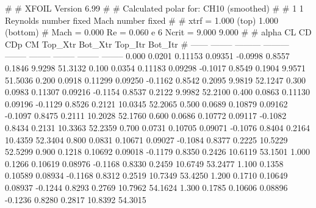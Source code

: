 #  
#       XFOIL         Version 6.99
#  
# Calculated polar for: CH10 (smoothed)                                 
#  
# 1 1 Reynolds number fixed          Mach number fixed         
#  
# xtrf =   1.000 (top)        1.000 (bottom)  
# Mach =   0.000     Re =     0.060 e 6     Ncrit =   9.000  9.000
#  
#   alpha    CL        CD       CDp       CM     Top_Xtr  Bot_Xtr  Top_Itr  Bot_Itr
#  ------ -------- --------- --------- -------- -------- -------- -------- --------
   0.000   0.0201   0.11153   0.09351  -0.0998   0.8557   0.1846   9.9298  51.3132
   0.100   0.0354   0.11183   0.09298  -0.1017   0.8549   0.1904   9.9571  51.5036
   0.200   0.0918   0.11299   0.09250  -0.1162   0.8542   0.2095   9.9819  52.1247
   0.300   0.0983   0.11307   0.09216  -0.1154   0.8537   0.2122   9.9982  52.2100
   0.400   0.0863   0.11130   0.09196  -0.1129   0.8526   0.2121  10.0345  52.2065
   0.500   0.0689   0.10879   0.09162  -0.1097   0.8475   0.2111  10.2028  52.1760
   0.600   0.0686   0.10772   0.09117  -0.1082   0.8434   0.2131  10.3363  52.2359
   0.700   0.0731   0.10705   0.09071  -0.1076   0.8404   0.2164  10.4359  52.3404
   0.800   0.0831   0.10671   0.09027  -0.1084   0.8377   0.2225  10.5229  52.5299
   0.900   0.1218   0.10692   0.09018  -0.1179   0.8350   0.2426  10.6119  53.1501
   1.000   0.1266   0.10619   0.08976  -0.1168   0.8330   0.2459  10.6749  53.2477
   1.100   0.1358   0.10589   0.08934  -0.1168   0.8312   0.2519  10.7349  53.4250
   1.200   0.1710   0.10649   0.08937  -0.1244   0.8293   0.2769  10.7962  54.1624
   1.300   0.1785   0.10606   0.08896  -0.1236   0.8280   0.2817  10.8392  54.3015
